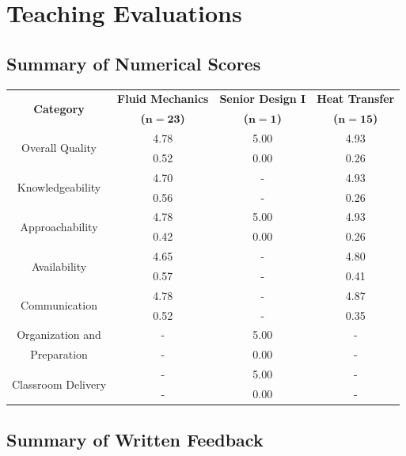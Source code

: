 \pagestyle{plain}
\chapter[Teaching Evaluations][Teaching Evaluations]{Teaching Evaluations}

\section{Summary of Numerical Scores}

\begin{table}[h]
\begin{center}
\renewcommand{\arraystretch}{1.15}
\setlength{\tabcolsep}{0.10cm}
\begin{tabular}{|c|c|c|c|}
\hline
\multirow{2}{*}{\textbf{Category}} & \textbf{Fluid Mechanics} & \textbf{Senior Design I} & \textbf{Heat Transfer} \\ 	
 &  \textbf{($\boldsymbol{n=23}$)} & \textbf{($\boldsymbol{n=1}$)} & \textbf{($\boldsymbol{n=15}$)} \\ 	
\hline
\multirow{2}{*}{Overall Quality} 	& 4.78 & 5.00 & 4.93 \\
						& 0.52 & 0.00 & 0.26 \\
\hline
\multirow{2}{*}{Knowledgeability} 	& 4.70 & - & 4.93 \\
						& 0.56 & - & 0.26 \\
\hline
\multirow{2}{*}{Approachability} 	& 4.78 & 5.00 & 4.93 \\
						& 0.42 & 0.00 & 0.26 \\
\hline
\multirow{2}{*}{Availability} 		& 4.65 & - & 4.80 \\
						& 0.57 & - & 0.41 \\
\hline
\multirow{2}{*}{Communication} 	& 4.78 & - & 4.87 \\
						& 0.52 & - & 0.35 \\
\hline
\multirow{1}{*}{Organization and} 	& - & 5.00 & - \\
\multirow{1}{*}{Preparation} 		& - & 0.00 & - \\
\hline
\multirow{2}{*}{Classroom Delivery} 	& - & 5.00 & - \\
						& - & 0.00 & - \\
\hline
\end{tabular} \end{center} \end{table}

\section{Summary of Written Feedback}

